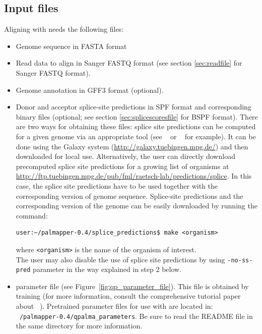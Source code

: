 \documentclass{article}
\begin{document}
\subsection{Input files}
\label{sec:inputfile}
Aligning with \PALMapper{} needs the following files: 
\begin{itemize}
\item Genome sequence in FASTA format
\item Read data to align in Sanger FASTQ format (see section
  \ref{sec:readfile} for Sanger FASTQ format).
\item Genome annotation in GFF3 format (optional).
\item Donor and acceptor splice-site predictions in SPF format and
corresponding binary files (optional; see section
\ref{sec:splicescoresfile} for BSPF format). There are two ways for
obtaining these files: splice site predictions can be computed for a
given genome via an appropriate tool (see
\mGene{}~\cite{Schweikertetal09,Schweikertetal09b} or
\ASP{}~\cite{Sonnenburgetal07} for example). It can be done using the
Galaxy system (\url{http://galaxy.tuebingen.mpg.de/}) and then
downloaded for local use. Alternatively, the user can directly
download precomputed splice site predictions for a growing list of
organisms at
\url{http://ftp.tuebingen.mpg.de/pub/fml/raetsch-lab/predictions/splice}. In
this case, the splice site predictions have to be used together
with the corresponding version of genome sequence. Splice-site
predictions and the corresponding version of the genome can be easily
downloaded by running the command: 
\begin{verbatim}
user:~/palmapper-0.4/splice_predictions$ make <organism>
\end{verbatim}
where \texttt{<organism>} is the name of the organism of interest.\\
The user may also disable the use of splice site predictions by using
\texttt{-no-ss-pred} parameter in the way explained in step 2 below.
\item \QP{} parameter file (see
  Figure~\ref{fig:qp_parameter_file}). This file is obtained by
  training \QP{} (for more information, consult the comprehensive tutorial
  paper about \PALMapper{}~\cite{Palmapper}). Pretrained \QP{}
  parameter files for use with \PALMapper{} are located 
in: \texttt{~/palmapper-0.4/qpalma\_parameters}. Be sure to read the
README file in the same directory for more information.
\end{itemize}
\end{document}
